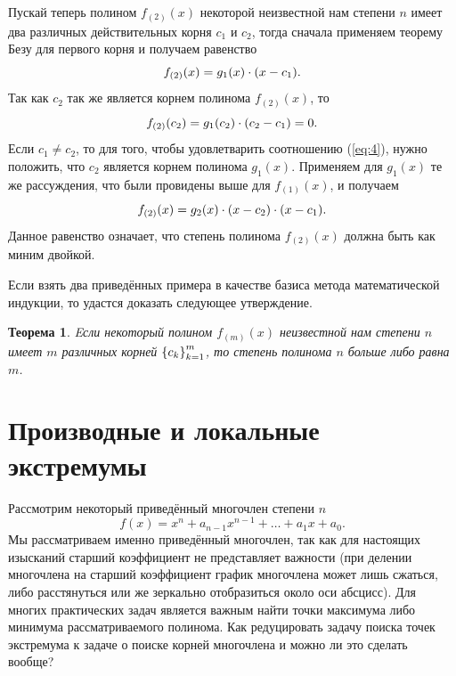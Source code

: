 \documentclass[12pt]{article}
\newtheorem{theorem}{Теорема}[section]
\begin{document}
Пускай теперь полином $f_{(2)}(x)$ некоторой неизвестной нам степени $n$ имеет два различных действительных корня $c_1$ и $c_2$, тогда сначала применяем теорему Безу для первого корня и получаем равенство
\begin{equation}
  f_{(2)}(x) = g_1(x)\cdot \qty(x-c_1).
\end{equation}
Так как $c_2$ так же является корнем полинома $f_{(2)}(x)$, то 
\begin{equation}
\label{eq:4}
  f_{(2)}(c_2) = g_1(c_2)\cdot \qty(c_2-c_1) = 0.
\end{equation}
Если $c_1 \ne c_2$, то для того, чтобы удовлетварить соотношению (\ref{eq:4}), нужно положить, что $c_2$ является корнем полинома $g_1(x)$. Применяем для $g_1(x)$ те же рассуждения, что были провидены выше для $f_{(1)}(x)$, и получаем
\begin{equation}
  f_{(2)}(x) = g_2(x)\cdot \qty(x-c_2)\cdot \qty(x-c_1).
\end{equation}
Данное равенство означает, что степень полинома $f_{(2)}(x)$ должна быть как миним двойкой.

\par
Если взять два приведённых примера в качестве базиса метода математической индукции, то удастся доказать следующее утверждение.

\begin{theorem}
  Eсли некоторый полином $f_{(m)}(x)$ неизвестной нам степени $n$ имеет $m$ различных корней $\qty{c_k}_{k=1}^m$, то степень полинома $n$ больше либо равна $m$.
\end{theorem}

\section{Производные и локальные экстремумы}
Рассмотрим некоторый приведённый многочлен степени $n$
\begin{equation}
  f(x) = x^n + a_{n-1} x^{n-1} + \ldots + a_1 x + a_0.
\end{equation}
Мы рассматриваем именно приведённый многочлен, так как для настоящих изысканий старший коэффициент не представляет важности (при делении многочлена на старший коэффициент график многочлена может лишь сжаться, либо расстянуться или же зеркально отобразиться около оси абсцисс). Для многих практических задач является важным найти точки максимума либо минимума рассматриваемого полинома. Как редуцировать задачу поиска точек экстремума к задаче о поиске корней многочлена и можно ли это сделать вообще?
\end{document}
